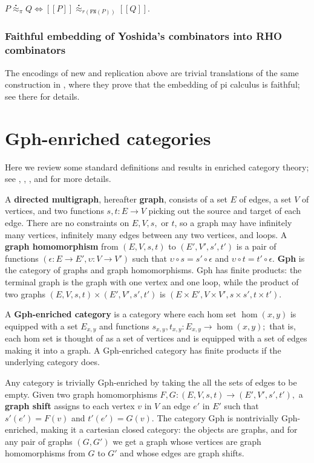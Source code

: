 \documentclass{llncs}
\newcommand{\maps}{\colon}
\newcommand{\ldb}{[\![}
\newcommand{\rdb}{]\!]}
\newcommand{\wbbisim}{\stackrel{\centerdot}{\approx}} %
\begin{document}
  $P \wbbisim_{\pi} Q \iff \ldb P \rdb \wbbisim_{r(\texttt{FN}(P))} \ldb Q \rdb$.

\subsubsection{Faithful embedding of Yoshida's combinators into RHO combinators}

The encodings of new and replication above are trivial translations of the same construction in \cite{DBLP:journals/entcs/MeredithR05}, where they prove that the embedding of pi calculus is faithful; see there for details.

\section{Gph-enriched categories}
Here we review some standard definitions and results in enriched category theory; see \cite{CIS-335497}, \cite{Power99EnrichedLawvereTheories}, \cite{DBLP:journals/acs/LackR11}, and \cite{Trimble} for more details.

A {\bf directed multigraph}, hereafter {\bf graph}, consists of a set $E$ of edges, a set $V$ of vertices, and two functions $s,t\maps E \to V$ picking out the source and target of each edge.  There are no constraints on $E, V, s,$ or $t$, so a graph may have infinitely many vertices, infinitely many edges between any two vertices, and loops.  A {\bf graph homomorphism} from $(E, V, s, t)$ to $(E', V', s', t')$ is a pair of functions $(\epsilon\maps E \to E', \upsilon\maps V \to V')$ such that $\upsilon\circ s = s' \circ \epsilon$ and $\upsilon\circ t = t' \circ \epsilon$.  {\bf Gph} is the category of graphs and graph homomorphisms.  Gph has finite products: the terminal graph is the graph with one vertex and one loop, while the product of two graphs $(E, V, s, t) \times (E', V', s', t')$ is $(E \times E', V \times V', s \times s', t\times t').$

A {\bf Gph-enriched category} is a category where each hom set $\hom(x,y)$ is equipped with a set $E_{x,y}$ and functions $s_{x,y}, t_{x,y}\maps E_{x,y} \to \hom(x,y);$ that is, each hom set is thought of as a set of vertices and is equipped with a set of edges making it into a graph.  A Gph-enriched category has finite products if the underlying category does.

Any category is trivially Gph-enriched by taking the all the sets of edges to be empty.  Given two graph homomorphisms $F, G\maps (E, V, s, t) \to (E', V', s', t'),$ a {\bf graph shift} assigns to each vertex $v$ in $V$ an edge $e'$ in $E'$ such that $s'(e') = F(v)$ and $t'(e') = G(v).$  The category Gph is nontrivially Gph-enriched, making it a cartesian closed category: the objects are graphs, and for any pair of graphs $(G, G')$ we get a graph whose vertices are graph homomorphisms from $G$ to $G'$ and whose edges are graph shifts.
\end{document}
